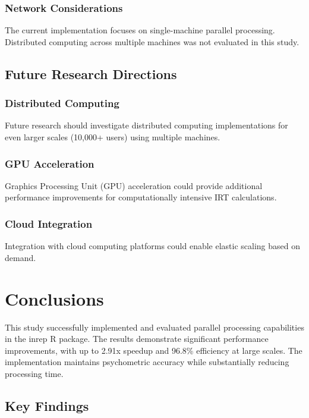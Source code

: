 \documentclass[11pt]{article}
\begin{document}
\subsubsection{Network Considerations}

The current implementation focuses on single-machine parallel processing. Distributed computing across multiple machines was not evaluated in this study.

\subsection{Future Research Directions}

\subsubsection{Distributed Computing}

Future research should investigate distributed computing implementations for even larger scales (10,000+ users) using multiple machines.

\subsubsection{GPU Acceleration}

Graphics Processing Unit (GPU) acceleration could provide additional performance improvements for computationally intensive IRT calculations.

\subsubsection{Cloud Integration}

Integration with cloud computing platforms could enable elastic scaling based on demand.

\section{Conclusions}

This study successfully implemented and evaluated parallel processing capabilities in the inrep R package. The results demonstrate significant performance improvements, with up to 2.91x speedup and 96.8\% efficiency at large scales. The implementation maintains psychometric accuracy while substantially reducing processing time.

\subsection{Key Findings}
\end{document}

